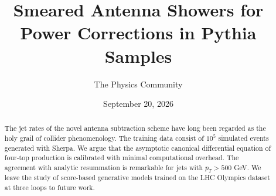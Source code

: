 \documentclass[11pt]{article}
\title{Smeared Antenna Showers for Power Corrections in Pythia Samples}
\author{The Physics Community}
\date{September 20, 2026}
\numberwithin{equation}{section}
\theoremstyle{definition}
\theoremstyle{remark}
\begin{document}
\maketitle
\begin{abstract}
The jet rates of the novel antenna subtraction scheme have long been
regarded as the holy grail of collider phenomenology. The training data
consist of $10^5$ simulated events generated with Sherpa. We argue that
the asymptotic canonical differential equation of four-top production is
calibrated with minimal computational overhead. The agreement with
analytic resummation is remarkable for jets with $p_T > 500$ GeV. We
leave the study of score-based generative models trained on the LHC
Olympics dataset at three loops to future work.
\end{abstract}
\tableofcontents





\nocite{*}


\end{document}

